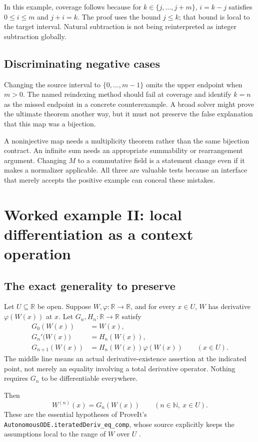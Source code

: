 \documentclass[11pt,a4paper]{article}
\newcommand{\code}[1]{\nolinkurl{#1}}
\newcommand{\N}{\mathbb{N}}
\newcommand{\R}{\mathbb{R}}
\theoremstyle{definition}
\begin{document}
In this example, coverage follows because for $k\in\{j,\ldots,j+m\}$,
$i=k-j$ satisfies $0\le i\le m$ and $j+i=k$. The proof uses the bound $j\le k$;
that bound is local to the target interval. Natural subtraction is not being
reinterpreted as integer subtraction globally.

\subsection{Discriminating negative cases}
Changing the source interval to $\{0,\ldots,m-1\}$ omits the upper endpoint
when $m>0$. The named reindexing method should fail at coverage and identify
$k=n$ as the missed endpoint in a concrete counterexample. A broad solver might
prove the ultimate theorem another way, but it must not preserve the false
explanation that this map was a bijection.

A noninjective map needs a multiplicity theorem rather than the same bijection
contract. An infinite sum needs an appropriate summability or rearrangement
argument. Changing $M$ to a commutative field is a statement change even if it
makes a normalizer applicable. All three are valuable tests because an interface
that merely accepts the positive example can conceal these mistakes.

\section{Worked example II: local differentiation as a context operation}
\label{sec:derivative}
\subsection{The exact generality to preserve}
Let $U\subseteq\R$ be open. Suppose $W,\varphi:\R\to\R$, and for every $x\in U$,
$W$ has derivative $\varphi(W(x))$ at $x$. Let $G_n,H_n:\R\to\R$ satisfy
\begin{align*}
 G_0(W(x))&=W(x),\\
 G_n'\bigl(W(x)\bigr)&=H_n(W(x)),\\
 G_{n+1}(W(x))&=H_n(W(x))\varphi(W(x))
 \qquad (x\in U).
\end{align*}
The middle line means an actual derivative-existence assertion at the indicated
point, not merely an equality involving a total derivative operator. Nothing
requires $G_n$ to be differentiable everywhere.

Then
\begin{equation}
 W^{(n)}(x)=G_n(W(x))\qquad(n\in\N,\ x\in U).
 \label{eq:ode}
\end{equation}
These are the essential hypotheses of ProveIt's
\code{AutonomousODE.iteratedDeriv_eq_comp}, whose source explicitly keeps the
assumptions local to the range of $W$ over $U$ \cite{p-ode}.
\end{document}
